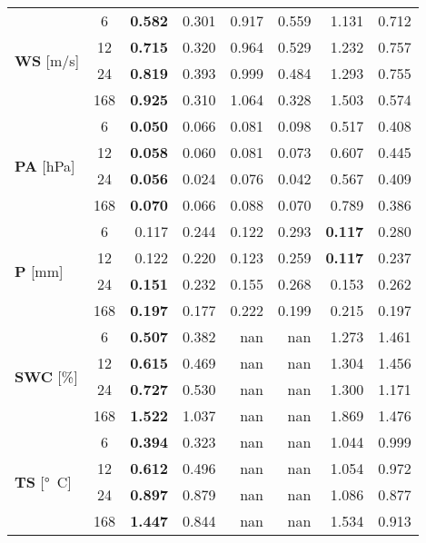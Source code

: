 \begin{table}
\begin{tabular}{p{2.1cm}c|rr|rr|rr}
\cline{1-8}
\multirow[c]{4}{*}{\parbox{2.1cm}{\textbf{WS} [\si{m/s}]}} & 6 & \bfseries 0.582 & 0.301 & 0.917 & 0.559 & 1.131 & 0.712 \\
 & 12 & \bfseries 0.715 & 0.320 & 0.964 & 0.529 & 1.232 & 0.757 \\
 & 24 & \bfseries 0.819 & 0.393 & 0.999 & 0.484 & 1.293 & 0.755 \\
 & 168 & \bfseries 0.925 & 0.310 & 1.064 & 0.328 & 1.503 & 0.574 \\
\cline{1-8}
\multirow[c]{4}{*}{\parbox{2.1cm}{\textbf{PA} [\si{hPa}]}} & 6 & \bfseries 0.050 & 0.066 & 0.081 & 0.098 & 0.517 & 0.408 \\
 & 12 & \bfseries 0.058 & 0.060 & 0.081 & 0.073 & 0.607 & 0.445 \\
 & 24 & \bfseries 0.056 & 0.024 & 0.076 & 0.042 & 0.567 & 0.409 \\
 & 168 & \bfseries 0.070 & 0.066 & 0.088 & 0.070 & 0.789 & 0.386 \\
\cline{1-8}
\multirow[c]{4}{*}{\parbox{2.1cm}{\textbf{P} [\si{mm}]}} & 6 & 0.117 & 0.244 & 0.122 & 0.293 & \bfseries 0.117 & 0.280 \\
 & 12 & 0.122 & 0.220 & 0.123 & 0.259 & \bfseries 0.117 & 0.237 \\
 & 24 & \bfseries 0.151 & 0.232 & 0.155 & 0.268 & 0.153 & 0.262 \\
 & 168 & \bfseries 0.197 & 0.177 & 0.222 & 0.199 & 0.215 & 0.197 \\
\cline{1-8}
\multirow[c]{4}{*}{\parbox{2.1cm}{\textbf{SWC} [\si{\%}]}} & 6 & \bfseries 0.507 & 0.382 & nan & nan & 1.273 & 1.461 \\
 & 12 & \bfseries 0.615 & 0.469 & nan & nan & 1.304 & 1.456 \\
 & 24 & \bfseries 0.727 & 0.530 & nan & nan & 1.300 & 1.171 \\
 & 168 & \bfseries 1.522 & 1.037 & nan & nan & 1.869 & 1.476 \\
\cline{1-8}
\multirow[c]{4}{*}{\parbox{2.1cm}{\textbf{TS} [\si{°C}]}} & 6 & \bfseries 0.394 & 0.323 & nan & nan & 1.044 & 0.999 \\
 & 12 & \bfseries 0.612 & 0.496 & nan & nan & 1.054 & 0.972 \\
 & 24 & \bfseries 0.897 & 0.879 & nan & nan & 1.086 & 0.877 \\
 & 168 & \bfseries 1.447 & 0.844 & nan & nan & 1.534 & 0.913 \\
\cline{1-8}
\bottomrule
\end{tabular}
\end{table}
